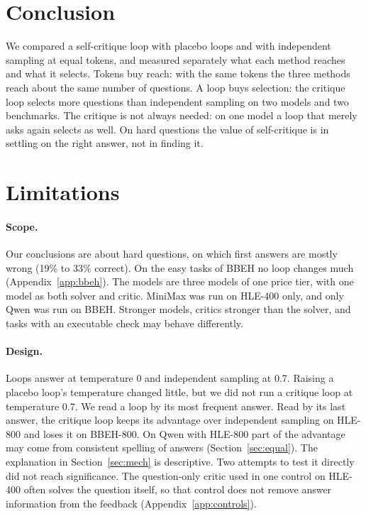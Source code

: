 \documentclass[11pt]{article}
\newcommand{\qw}{Qwen}
\newcommand{\mm}{MiniMax}
\begin{document}
\section{Conclusion}

We compared a self-critique loop with placebo loops and with independent sampling at equal tokens, and measured separately what each method reaches and what it selects.
Tokens buy reach: with the same tokens the three methods reach about the same number of questions.
A loop buys selection: the critique loop selects more questions than independent sampling on two models and two benchmarks.
The critique is not always needed: on one model a loop that merely asks again selects as well.
On hard questions the value of self-critique is in settling on the right answer, not in finding it.

\section*{Limitations}

\paragraph{Scope.}
Our conclusions are about hard questions, on which first answers are mostly wrong (19\% to 33\% correct). On the easy tasks of BBEH no loop changes much (Appendix~\ref{app:bbeh}).
The models are three models of one price tier, with one model as both solver and critic. \mm{} was run on HLE-400 only, and only \qw{} was run on BBEH.
Stronger models, critics stronger than the solver, and tasks with an executable check may behave differently.

\paragraph{Design.}
Loops answer at temperature 0 and independent sampling at 0.7. Raising a placebo loop's temperature changed little, but we did not run a critique loop at temperature 0.7.
We read a loop by its most frequent answer. Read by its last answer, the critique loop keeps its advantage over independent sampling on HLE-800 and loses it on BBEH-800.
On \qw{} with HLE-800 part of the advantage may come from consistent spelling of answers (Section~\ref{sec:equal}).
The explanation in Section~\ref{sec:mech} is descriptive. Two attempts to test it directly did not reach significance.
The question-only critic used in one control on HLE-400 often solves the question itself, so that control does not remove answer information from the feedback (Appendix~\ref{app:controls}).
\end{document}
